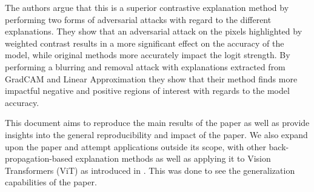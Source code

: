The authors argue that this is a superior contrastive explanation method by performing two forms of adversarial attacks with regard to the different explanations. They show that an adversarial attack on the pixels highlighted by weighted contrast results in a more significant effect on the accuracy of the model, while original methods more accurately impact the logit strength. By performing a blurring and removal attack with explanations extracted from GradCAM and Linear Approximation they show that their method finds more impactful negative and positive regions of interest with regards to the model accuracy. 

This document aims to reproduce the main results of the paper as well as provide insights into the general reproducibility and impact of the paper. We also expand upon the paper and attempt applications outside its scope, with other back-propagation-based explanation methods as well as applying it to Vision Transformers (ViT) as introduced in \citet{visual-transformer}. This was done to see the generalization capabilities of the paper.




